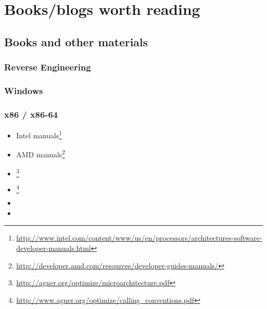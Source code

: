 \part{Books/blogs worth reading}

\chapter{Books and other materials}

\section{Reverse Engineering}



\section{Windows}



\section{\CCpp}



\section{x86 / x86-64}

\label{x86_manuals}
\begin{itemize}
\item Intel manuals\footnote{\AlsoAvailableAs \url{http://www.intel.com/content/www/us/en/processors/architectures-software-developer-manuals.html}}

\item AMD manuals\footnote{\AlsoAvailableAs \url{http://developer.amd.com/resources/developer-guides-manuals/}}

\item \AgnerFog{}\footnote{\AlsoAvailableAs \url{http://agner.org/optimize/microarchitecture.pdf}}

\item \AgnerFogCC{}\footnote{\AlsoAvailableAs \url{http://www.agner.org/optimize/calling_conventions.pdf}}

\item \IntelOptimization

\item \AMDOptimization
\end{itemize}

